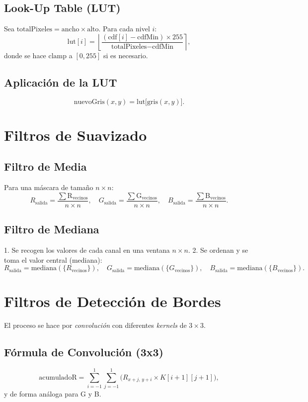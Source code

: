 \documentclass[11pt]{article}
\begin{document}
\subsection{Look-Up Table (LUT)}
Sea \(\text{totalPixeles} = \text{ancho} \times \text{alto}\). Para cada nivel \(i\):
\[
\text{lut}[i] = \left\lfloor \frac{(\text{cdf}[i] - \text{cdfMin}) \times 255}{\text{totalPixeles} - \text{cdfMin}} \right\rceil,
\]
donde se hace \(\text{clamp}\) a \([0, 255]\) si es necesario.

\subsection{Aplicación de la LUT}
\[
\text{nuevoGris}(x, y) = \text{lut}\bigl[\text{gris}(x, y)\bigr].
\]

\section{Filtros de Suavizado}

\subsection{Filtro de Media}
Para una máscara de tamaño \(n \times n\):
\[
R_{\text{salida}} = \frac{ \sum \text{R}_{\text{vecinos}} }{n \times n}, \quad
G_{\text{salida}} = \frac{ \sum \text{G}_{\text{vecinos}} }{n \times n}, \quad
B_{\text{salida}} = \frac{ \sum \text{B}_{\text{vecinos}} }{n \times n}.
\]

\subsection{Filtro de Mediana}
1. Se recogen los valores de cada canal en una ventana \(n \times n\).
2. Se ordenan y se toma el valor central (mediana):
\[
R_{\text{salida}} = \text{mediana}(\{R_{\text{vecinos}}\}), \quad
G_{\text{salida}} = \text{mediana}(\{G_{\text{vecinos}}\}), \quad
B_{\text{salida}} = \text{mediana}(\{B_{\text{vecinos}}\}).
\]

\section{Filtros de Detección de Bordes}
El proceso se hace por \textit{convolución} con diferentes \textit{kernels} de \(3 \times 3\).

\subsection{Fórmula de Convolución (3x3)}
\[
\text{acumuladoR} = \sum_{i=-1}^{1} \sum_{j=-1}^{1} \bigl(R_{x+j,\,y+i} \times K[i+1][j+1]\bigr),
\]
y de forma análoga para G y B.
\end{document}
